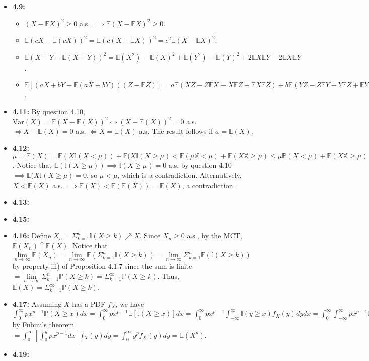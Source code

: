 \documentclass[12pt]{article}
\newcommand{\E}{\mathbb{E}}
\newcommand{\I}{\mathbb{I}}
\newcommand{\p}{\mathbb{P}}
\newcommand{\V}{\text{Var}}
\begin{document}
\begin{itemize}
    \item \textbf{4.9:}
    \begin{itemize}
        \item [i)] $(X - \E X)^2 \geq 0$ a.s. $\implies \E(X - \E X)^2 \geq 0$.
        \item [ii)] $\E(cX - \E(cX))^2 = \E(c(X - \E X))^2 = c^2 \E(X - \E X)^2$.
        \item [iii)] $\E(X+Y-\E(X+Y))^2 = \E(X^2)-\E(X)^2+\E(Y^2)-\E(Y)^2 + 2\E X \E Y - 2\E X \E Y$.
        \item [iv)] $\E[(aX+bY-\E(aX+bY))(Z - \E Z)] = a\E(XZ - Z\E X - X\E Z + \E X \E Z) + b\E(YZ - Z\E Y - Y\E Z + \E Y \E Z) = a\E[(X - \E X)(Z - \E Z)] + b\E[(Y - \E Y)(Z - \E Z)]$.
    \end{itemize}
    \item \textbf{4.11:} By question 4.10, $\V(X) = \E(X - \E(X))^2 \iff (X - \E(X))^2 = 0$ a.s. $\iff X - \E(X) = 0$ a.s. $\iff X = \E(X)$ a.s. The result follows if $a = \E(X)$.
    \item \textbf{4.12:} $\mu = \E(X) = \E(X\mathbb{I}(X < \mu)) + \E(X\mathbb{I}(X \geq \mu) < \E(\mu\mathbb{X < \mu}) + \E(X\mathbb{X \geq \mu}) \leq \mu\p(X < \mu) + \E(X\mathbb{X \geq \mu}) \leq \mu + \E(X\mathbb{I})$. Notice that $\E(\mathbb{I}(X \geq \mu)) \implies \mathbb{I}(X \geq \mu) = 0$ a.s. by question 4.10 $\implies \E(X\mathbb{I}(X \geq \mu) = 0$, so $\mu < \mu$, which is a contradiction. Alternatively, $X < \E(X)$ a.s. $\implies \E(X) < \E(\E(X)) = \E(X)$, a contradiction.
    \item \textbf{4.13:}
    \item \textbf{4.15:}
    \item \textbf{4.16:} Define $X_n = \Sigma_{k=1}^n \I(X \geq k) \nearrow X$. Since $X_n \geq 0$ a.s., by the MCT, $\E(X_n) \uparrow \E(X)$. Notice that $\lim \limits_{n \to \infty} \E(X_n) = \lim \limits_{n \to \infty} \E(\Sigma_{k=1}^n \I(X \geq k)) = \lim \limits_{n \to \infty} \Sigma_{k=1}^n \E(\I(X \geq k))$ by property iii) of Proposition 4.1.7 since the sum is finite $= \lim \limits_{n \to \infty} \Sigma_{k=1}^n \p(X \geq k) = \Sigma_{k=1}^\infty \p(X \geq k)$. Thus, $\E(X) = \Sigma_{k=1}^\infty \p(X \geq k)$.
    \item \textbf{4.17:} Assuming $X$ has a PDF $f_X$, we have $\int_0^\infty px^{p - 1} \p(X \geq x)dx = \int_0^\infty px^{p - 1} \E[\mathbb{I}(X \geq x)]dx = \int_0^\infty px^{p - 1} \int_{-\infty}^\infty \mathbb{I}(y \geq x)f_X(y)dydx = \int_0^\infty \int_{-\infty}^\infty px^{p - 1} \mathbb{I}(y \geq x)f_X(y)dydx = \int_0^\infty \int_x^\infty px^{p - 1}f_X(y)dydx = \int_0^\infty \int_0^y px^{p - 1} f_X(y)dxdy$ by Fubini's theorem $= \int_0^\infty [\int_0^y px^{p - 1} dx] f_X(y)dy = \int_0^\infty y^p f_X(y)dy = \E(X^p)$.
    \item \textbf{4.19:}
\end{itemize}
\end{document}
